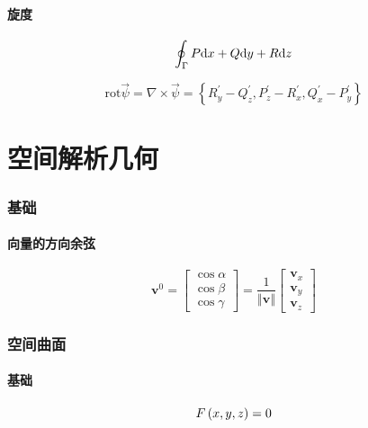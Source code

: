 \documentclass{article}
\begin{document}
\subsection{旋度}

\begin{definition}
    \[\oint_\Gamma P\mathrm d x+Q\mathrm d y+R \mathrm d z\]
\end{definition}

\begin{theorem}[旋度]
    \[\mathrm{rot}\vec\psi=
        \nabla\times\vec\psi=\left\{
        R_y^\prime-Q_z^\prime,
        P_z^\prime-R_x^\prime,
        Q_x^\prime-P_y^\prime
        \right\}\]
\end{theorem}

\part{空间解析几何}

\section{基础}

\subsection{向量的方向余弦}

\[\boldsymbol v^0=
    \begin{bmatrix}
        \cos\alpha \\
        \cos\beta  \\
        \cos\gamma
    \end{bmatrix}=
    \frac1{\left\Vert\boldsymbol v\right\Vert}
    \begin{bmatrix}\boldsymbol v_x\\\boldsymbol v_y\\\boldsymbol v_z\end{bmatrix}\]

\section{空间曲面}

\subsection{基础}

\begin{definition}[]
    \[F\left(x,y,z\right)=0\]
\end{definition}
\end{document}

